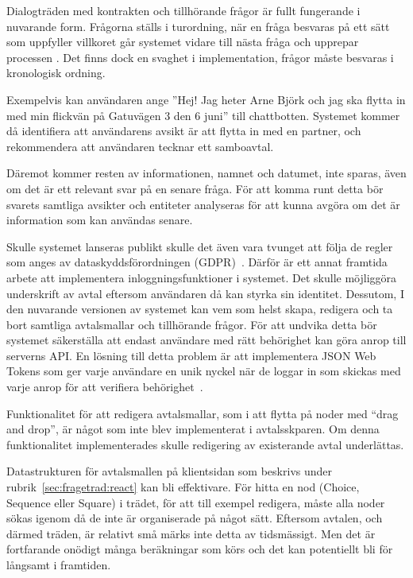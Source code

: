 \documentclass[a4paper,12pt]{article}
\begin{document}
Dialogträden med kontrakten och tillhörande frågor är fullt fungerande i nuvarande form. Frågorna ställs i turordning, när en fråga besvaras på ett sätt som uppfyller villkoret går systemet vidare till nästa fråga och upprepar processen . Det finns dock en svaghet i implementation, frågor måste besvaras i kronologisk ordning. 

Exempelvis kan användaren ange ''Hej! Jag heter Arne Björk och jag ska flytta in med min flickvän på Gatuvägen 3 den 6 juni'' till chattbotten. Systemet kommer då identifiera att användarens avsikt är att flytta in med en partner, och rekommendera att användaren tecknar ett samboavtal. 

Däremot kommer resten av informationen, namnet och datumet, inte sparas, även om det är ett relevant svar på en senare fråga. För att komma runt detta bör svarets samtliga avsikter och entiteter analyseras för att kunna avgöra om det är information som kan användas senare.

Skulle systemet lanseras publikt skulle det även vara tvunget att följa de regler som anges av dataskyddsförordningen (GDPR)~\cite{web:gdpr}. Därför är ett annat framtida arbete att implementera inloggningsfunktioner i systemet. Det skulle möjliggöra underskrift av avtal eftersom användaren då kan styrka sin identitet. Dessutom, I den nuvarande versionen av systemet kan vem som helst skapa, redigera och ta bort samtliga avtalsmallar och tillhörande frågor. För att undvika detta bör systemet säkerställa att endast användare med rätt behörighet kan göra anrop till serverns API. En lösning till detta problem är att implementera JSON Web Tokens som ger varje användare en unik nyckel när de loggar in som skickas med varje anrop för att verifiera behörighet~\cite{web:jwt}.

Funktionalitet för att redigera avtalsmallar, som i att flytta på noder med ``drag and drop'', är något som inte blev implementerat i avtalsskparen. Om denna funktionalitet implementerades skulle redigering av existerande avtal underlättas.

Datastrukturen för avtalsmallen på klientsidan som beskrivs under rubrik~\ref{sec:fragetrad:react} kan bli effektivare. För hitta en nod (Choice, Sequence eller Square) i trädet, för att till exempel redigera, måste alla noder sökas igenom då de inte är organiserade på något sätt. Eftersom avtalen, och därmed träden, är relativt små märks inte detta av tidsmässigt. Men det är fortfarande onödigt många beräkningar som körs och det kan potentiellt bli för långsamt i framtiden.
\end{document}
